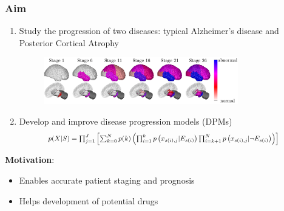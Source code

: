 \documentclass[10pt,xcolor=table]{beamer}
\begin{document}
\begin{frame}
\frametitle{Aim}

\begin{enumerate}
 \item Study the progression of two diseases: typical Alzheimer's disease and Posterior Cortical Atrophy
 
  \begin{figure}
  \centering 
  \vspace{1em}
  \includegraphics[width=0.8\textwidth]{brain_progression_16082017.png}
  \end{figure}
 
 \vspace{1em}
 \item Develop and improve disease progression models (DPMs)
  \begin{equation}
  \resizebox{0.8\columnwidth}{!}{%
  $p(X|S) = \prod_{j=1}^J \left[ \sum_{k=0}^N p(k) \left( \prod_{i=1}^k p\left(x_{s(i),j} | E_{s(i)} \right) \prod_{i=k+1}^N p\left(x_{s(i),j} | \neg E_{s(i)}\right) \right) \right]$
  }
  \end{equation}


\end{enumerate}

\textbf{Motivation}:
\begin{itemize}
 \item Enables accurate patient staging and prognosis
 \item Helps development of potential drugs
\end{itemize}


\end{frame}
\end{document}
